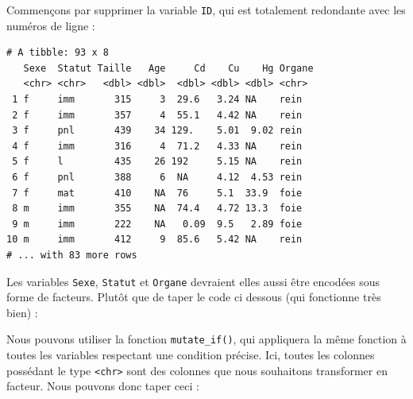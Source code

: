 \documentclass[
  a4paper,
]{article}
\newenvironment{Shaded}{\begin{snugshade}}{\end{snugshade}}
\newcommand{\DataTypeTok}[1]{\textcolor[rgb]{0.00,0.34,0.68}{#1}}
\newcommand{\KeywordTok}[1]{\textcolor[rgb]{0.12,0.11,0.11}{\textbf{#1}}}
\newcommand{\NormalTok}[1]{\textcolor[rgb]{0.12,0.11,0.11}{#1}}
\newcommand{\OperatorTok}[1]{\textcolor[rgb]{0.12,0.11,0.11}{#1}}
\newcommand{\StringTok}[1]{\textcolor[rgb]{0.75,0.01,0.01}{#1}}
\begin{document}
Commençons par supprimer la variable \texttt{ID}, qui est totalement redondante avec les numéros de ligne :

\begin{Shaded}
\end{Shaded}

\begin{verbatim}
# A tibble: 93 x 8
   Sexe  Statut Taille   Age     Cd    Cu    Hg Organe
   <chr> <chr>   <dbl> <dbl>  <dbl> <dbl> <dbl> <chr> 
 1 f     imm       315     3  29.6   3.24 NA    rein  
 2 f     imm       357     4  55.1   4.42 NA    rein  
 3 f     pnl       439    34 129.    5.01  9.02 rein  
 4 f     imm       316     4  71.2   4.33 NA    rein  
 5 f     l         435    26 192     5.15 NA    rein  
 6 f     pnl       388     6  NA     4.12  4.53 rein  
 7 f     mat       410    NA  76     5.1  33.9  foie  
 8 m     imm       355    NA  74.4   4.72 13.3  foie  
 9 m     imm       222    NA   0.09  9.5   2.89 foie  
10 m     imm       412     9  85.6   5.42 NA    rein  
# ... with 83 more rows
\end{verbatim}

Les variables \texttt{Sexe}, \texttt{Statut} et \texttt{Organe} devraient elles aussi être encodées sous forme de facteurs. Plutôt que de taper le code ci dessous (qui fonctionne très bien) :

\begin{Shaded}
\end{Shaded}

Nous pouvons utiliser la fonction \texttt{mutate\_if()}, qui appliquera la même fonction à toutes les variables respectant une condition précise. Ici, toutes les colonnes possédant le type \texttt{\textless{}chr\textgreater{}} sont des colonnes que nous souhaitons transformer en facteur. Nous pouvons donc taper ceci :
\end{document}
